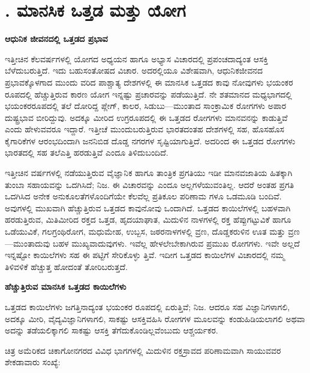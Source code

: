 
\chapter{. ಮಾನಸಿಕ ಒತ್ತಡ ಮತ್ತು ಯೋಗ}

\textbf{ಆಧುನಿಕ ಜೀವನದಲ್ಲಿ ಒತ್ತಡದ ಪ್ರಭಾವ}

ಇತ್ತೀಚಿನ ಕೆಲವರ್ಷಗಳಲ್ಲಿ ಯೋಗದ ಅಧ್ಯಯನ ಹಾಗೂ ಅಭ್ಯಾಸ ವಿಚಾರದಲ್ಲಿ ಪ್ರಪಂಚದಾದ್ಯಂತ ಆಸಕ್ತಿ ಬೆಳೆದುಬರುತ್ತಿದೆ. ಇದು ಬಹುಸಂತೋಷದ ವಿಚಾರ. ಅದರಲ್ಲಿಯೂ ವಿಶೇಷವಾಗಿ, ಆಧುನಿಕಜೀವನದ ಪ್ರಭಾವಕ್ಕೊಳಗಾದ ಮುಂದು ವರಿದ ಪಾಶ್ಚಾತ್ಯ ದೇಶಗಳಲ್ಲಿ ಈ ಮಾನಸಿಕ ಒತ್ತಡದ ಕಾವು ನೋವುಗಳು ಭಯಂಕರ ರೂಪದಲ್ಲಿ ಹೆಚ್ಚುತ್ತಿರುವ ಕಾರಣ ಯೋಗ ಇನ್ನಷ್ಟು ಪ್ರಚಾರವನ್ನು ಪಡೆಯುತ್ತಿದೆ.  ನೇ ಶತಮಾನದ ಮಧ್ಯಭಾಗದಲ್ಲಿ ಭಯಂಕರರೂಪದಲ್ಲಿ ತಲೆ ದೋರಿದ್ದ ಪ್ಲೇಗ್, ಕಾಲರ, ಸಿಡುಬು—ಮುಂತಾದ ಸಾಂಕ್ರಾಮಿಕ ರೋಗಗಳು ಅಪಾರ ದುಷ್ಟ್ರಭಾವ ಬೀರಿದ್ದುವು. ಅದಕ್ಕೂ ಮೀರಿದ ಉಗ್ರರೂಪದಲ್ಲಿ ಈ ಒತ್ತಡದ ರೋಗಗಳು ಮಾನವನನ್ನು ಕಾಡುತ್ತಿವೆ ಎಂದು ಹೇಳುವವರೂ ಇದ್ದಾರೆ. ಇತ್ತೀಚೆ ಮುಂದುಬರುತ್ತಿರುವ ಭಾರತದಂತಹ ದೇಶಗಳಲ್ಲಿ ಸಹ, ಹೊಸಹೊಸ ಕೈಗಾರಿಕೆಗಳ ಆರಂಭದಿಂದಾಗಿ ಜನನಿಬಿಡ ದೊಡ್ಡ ನಗರಗಳ ಸೃಷ್ಟಿಯಾಗುತ್ತಿದೆ. ಅದರಿಂದ ಈ ಒತ್ತಡದ ರೋಗಗಳು ಭಾರತದಲ್ಲಿ ಸಹ ತಲೆಎತ್ತಿ ಹರಡುತ್ತಿವೆ ಎಂದೂ ತಿಳಿದುಬಂದಿದೆ.

ಇತ್ತೀಚಿನ ವರ್ಷಗಳಲ್ಲಿ ನಡೆಯುತ್ತಿರುವ ವೈಜ್ಞಾನಿಕ ಹಾಗೂ ತಾಂತ್ರಿಕ ಪ್ರಗತಿಯು ಇಡೀ ಮಾನವಜಾತಿಯ ಹಿತಕ್ಕಾಗಿ ತುಂಬಾ ಸಹಾಯವನ್ನು ಒದಗಿಸಿದೆ; ನಿಜ. ಈ ವಿಚಾರವನ್ನು ಎಂದೂ ಅಲ್ಲಗಳೆಯುವಂತಿಲ್ಲ. ಆದರೆ ಅಂತಹ ಪ್ರಗತಿ ಒದಗಿಸಿದ ಅನೇಕ ಅನುಕೂಲತೆಗಳೊಂದಿಗೆಯೇ ಕೆಲವೆಲ್ಲ ಪ್ರತಿಕೂಲ ಪರಿಣಾಮ ಗಳೂ ಒಡಮೂಡಿ ಬಂದಿವೆ. ಅವುಗಳಲ್ಲಿ ಮುಖವಾಗಿ ಹೆಚ್ಚುತ್ತಿರುವ ಒತ್ತಡದ ಕಾವುನೋವು ಒಂದಾಗಿದೆ. ಒತ್ತಡದ ಕಾಯಿಲೆಗಳಲ್ಲಿ ಬಹಳವಾಗಿ ಹರಡುತ್ತಿರುವ, ಮಿತಿಮೀರಿದ ರಕ್ತದ ಒತ್ತಡ, ಹೃದಯಾಘಾತ, ಮಿದುಳಿನ ನಾಳಗಳಲ್ಲಿ ರಕ್ತ ಹೆಪ್ಪುಗಟ್ಟುವಿಕೆ ಹಾಗೂ ಒಡೆಯುವಿಕೆ, ಗಲಗ್ರಂಥಿರೋಗ, ಮಧುಮೇಹ, ಉಬ್ಬಸ, ಜಠರನಾಳಗಳಲ್ಲಿ ವ್ರಣ, ದೊಡ್ಡಕರುಳಿನ ಊತ ಮತ್ತು ವ್ರಣ—ಮುಂತಾದುವು ಬಹಳ ಮುಖ್ಯವಾದುವುಗಳು. ಇವೆಲ್ಲ ಹೇಳಲೇಬೇಕಾಗಿರುವ ಪ್ರಮುಖ ರೋಗಗಳು. ಇವೇ ಅಲ್ಲದೆ ಇನ್ನಷ್ಟೋ ಕಾಯಿಲೆಗಳು ಸಹ ಈ ಪಟ್ಟಿಗೆ ಸೇರಿಕೊಳ್ಳು ತ್ತಿವೆ. ಇದೀಗ ಒತ್ತಡದ ಕಾಯಿಲೆಗಳ ವಿಚಾರದಲ್ಲಿ ನಮ್ಮ ತಿಳಿವಳಿಕೆ ಹೆಚ್ಚುತ್ತ ಹೋದಂತೆ ತೋರಿಬರುತ್ತದೆ.

\textbf{ಹೆಚ್ಚುತ್ತಿರುವ ಮಾನಸಿಕ ಒತ್ತಡದ ಕಾಯಿಲೆಗಳು}

ಒತ್ತಡದ ಕಾಯಿಲೆಗಳು ಜಗತ್ತಿನಾದ್ಯಂತ ಭಯಂಕರ ರೂಪದಲ್ಲಿ ಏರುತ್ತಿವೆ; ನಿಜ. ಆದರೂ ಸಹ ವಿಜ್ಞಾನಿಗಳಾಗಲಿ, ಅದಕ್ಕೂ ಮೀರಿ, ವೈದ್ಯವಿಜ್ಞಾನಿಗಳಾಗಲಿ, ಸಾಕಷ್ಟು ಆಸಕ್ತಿವಹಿಸಿ ರೋಗಗಳ ಮೂಲವನ್ನು ಕಂಡುಹಿಡಿಯಲಾಗಲಿ ಅಥವಾ ಅದನ್ನು ತಡೆಯಲಿಕ್ಕಾಗಲಿ ಸಾಕಷ್ಟು ಆಸಕ್ತಿ ತೆಗೆದುಕೊಂಡಿಲ್ಲವೆಂಬುದು ಆಶ್ಚರ್ಯಕರ.

ಚಿತ್ರ  ಅಮೆರಿಕದ ಚಿಕಾಗೋನಗರದ ವಿವಿಧ ಭಾಗಗಳಲ್ಲಿ ಮಿದುಳಿನ ರಕ್ತಸ್ರಾವದ ಪರಿಣಾಮವಾಗಿ ಸಾಯುವವರ ಶೇಕಡಾವಾರು ಸಂಖ್ಯೆ:

\begin{center}
\textbf{  }
\end{center}


